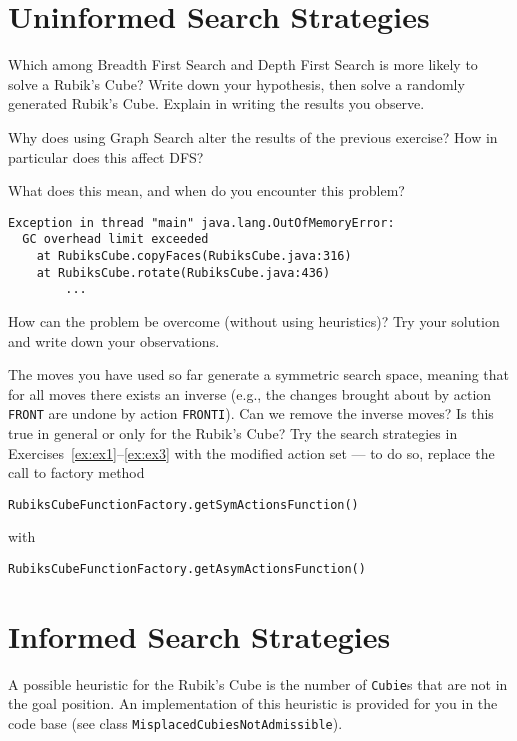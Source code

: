 \documentclass[a4paper]{article}
\begin{document}
\section{Uninformed Search Strategies}

{\ex{}\label{ex:ex1} Which among Breadth First Search and Depth First Search is more likely to solve a Rubik's Cube?  Write down your hypothesis, then solve a randomly generated Rubik's Cube.  Explain in writing the results you observe.\vspace{0.1cm}}

{\ex{}\label{ex:ex2} Why does using Graph Search alter the results of the previous exercise?  How in particular does this affect DFS?\vspace{0.1cm}}

{\ex{}\label{ex:ex3} What does this mean, and when do you encounter this problem?  
\begin{lstlisting}
Exception in thread "main" java.lang.OutOfMemoryError:
  GC overhead limit exceeded
    at RubiksCube.copyFaces(RubiksCube.java:316)
    at RubiksCube.rotate(RubiksCube.java:436)
        ...
\end{lstlisting}
How can the problem be overcome (without using heuristics)?  Try your solution and write down your observations.
\vspace{0.1cm}}

{\ex{}\label{ex:ex4} The moves you have used so far generate a symmetric search space, meaning that for all moves there exists an inverse (e.g., the changes brought about by action {\tt FRONT} are undone by action {\tt FRONTI}).  Can we remove the inverse moves? Is this true in general or only for the Rubik's Cube? Try the search strategies in Exercises~\ref{ex:ex1}--\ref{ex:ex3} with the modified action set --- to do so, replace the call to factory method
\begin{lstlisting}
RubiksCubeFunctionFactory.getSymActionsFunction()
\end{lstlisting}
with
\begin{lstlisting}
RubiksCubeFunctionFactory.getAsymActionsFunction()
\end{lstlisting}
\vspace{0.1cm}}


\section{Informed Search Strategies}
A possible heuristic for the Rubik's Cube is the number of {\tt Cubie}s that are not in the goal position.  An implementation of this heuristic is provided for you in the code base (see class {\tt MisplacedCubiesNotAdmissible}).
\end{document}
